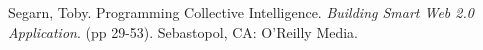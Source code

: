 \documentclass{article}
\begin{document}
\newpage
\begin{thebibliography}{9}
%
Segarn, Toby. Programming Collective Intelligence. \textit{Building Smart Web 2.0 Application}. (pp 29-53). Sebastopol, CA: O'Reilly Media.


\end{thebibliography}
\end{document}

